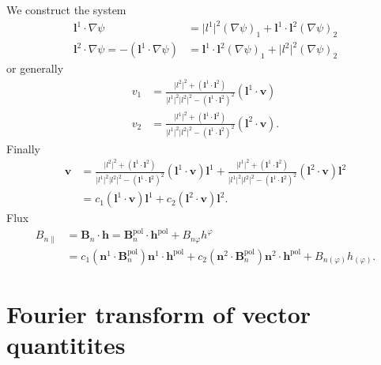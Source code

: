 \documentclass[a4paper, 10pt, english]{article}
\let\temp\varrho
\let\varrho\rho
\let\rho\temp
\let\temp\vartheta
\let\vartheta\theta
\let\theta\temp
\let\temp\varphi
\let\varphi\phi
\let\phi\temp
\let\vec\symbf
\newcommand*\pol{\ensuremath{\textrm{pol}}}  %
\begin{document}
We construct the system
\begin{align*}
  \vec{l}^{1} \cdot \nabla \psi &= \lvert l^{1} \rvert^{2} (\nabla \psi)_{1} + \vec{l}^{1} \cdot \vec{l}^{2} (\nabla \psi)_{2} \\
  \vec{l}^{2} \cdot \nabla \psi = -(\vec{l}^{1} \cdot \nabla \psi) &= \vec{l}^{1} \cdot \vec{l}^{2} (\nabla \psi)_{1} + \lvert l^{2} \rvert^{2} (\nabla \psi)_{2}
\end{align*}
or generally
\begin{align*}
  v_{1} &= \frac{\lvert l^{2} \rvert^{2} + (\vec{l}^{1} \cdot \vec{l}^{2})}{\lvert l^{1} \rvert^{2} \lvert l^{2} \rvert^{2} - (\vec{l}^{1} \cdot \vec{l}^{2})^{2}} (\vec{l}^{1} \cdot \vec{v}) \\
  v_{2} &= \frac{\lvert l^{1} \rvert^{2} + (\vec{l}^{1} \cdot \vec{l}^{2})}{\lvert l^{1} \rvert^{2} \lvert l^{2} \rvert^{2} - (\vec{l}^{1} \cdot \vec{l}^{2})^{2}} (\vec{l}^{2} \cdot \vec{v}).
\end{align*}
Finally
\begin{align}
  \vec{v} &= \frac{\lvert l^{2} \rvert^{2} + (\vec{l}^{1} \cdot \vec{l}^{2})}{\lvert l^{1} \rvert^{2} \lvert l^{2} \rvert^{2} - (\vec{l}^{1} \cdot \vec{l}^{2})^{2}}(\vec{l}^{1} \cdot \vec{v}) \vec{l}^{1} + \frac{\lvert l^{1} \rvert^{2} + (\vec{l}^{1} \cdot \vec{l}^{2})}{\lvert l^{1} \rvert^{2} \lvert l^{2} \rvert^{2} - (\vec{l}^{1} \cdot \vec{l}^{2})^{2}}(\vec{l}^{2} \cdot \vec{v}) \vec{l}^{2} \\
  &= c_{1} (\vec{l}^{1} \cdot \vec{v}) \vec{l}^{1} + c_{2} (\vec{l}^{2} \cdot \vec{v}) \vec{l}^{2}.
\end{align}
Flux
\begin{align}
  B_{n \parallel} &= \vec{B}_{n} \cdot \vec{h} = \vec{B}_{n}^{\pol} \cdot \vec{h}^{\pol} + B_{n \phi} h^{\phi} \nonumber \\
  &= c_{1} (\vec{n}^{1} \cdot \vec{B}_{n}^{\pol}) \vec{n}^{1} \cdot \vec{h}^{\pol} + c_{2} (\vec{n}^{2} \cdot \vec{B}_{n}^{\pol}) \vec{n}^{2} \cdot \vec{h}^{\pol} + B_{n (\phi)} h_{(\phi)}.
\end{align}

\section{Fourier transform of vector quantitites}
\end{document}
